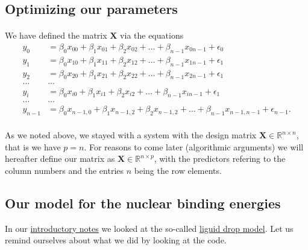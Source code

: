 \documentclass[%
oneside,                 %
final,                   %
10pt]{article}
\begin{document}
\subsection*{Optimizing our parameters}

\paragraph{}
We have defined the matrix $\bm{X}$ via the equations
\begin{align*}
y_0&=\beta_0x_{00}+\beta_1x_{01}+\beta_2x_{02}+\dots+\beta_{n-1}x_{0n-1}+\epsilon_0\\
y_1&=\beta_0x_{10}+\beta_1x_{11}+\beta_2x_{12}+\dots+\beta_{n-1}x_{1n-1}+\epsilon_1\\
y_2&=\beta_0x_{20}+\beta_1x_{21}+\beta_2x_{22}+\dots+\beta_{n-1}x_{2n-1}+\epsilon_1\\
\dots & \dots \\
y_{i}&=\beta_0x_{i0}+\beta_1x_{i1}+\beta_2x_{i2}+\dots+\beta_{n-1}x_{in-1}+\epsilon_1\\
\dots & \dots \\
y_{n-1}&=\beta_0x_{n-1,0}+\beta_1x_{n-1,2}+\beta_2x_{n-1,2}+\dots+\beta_{n-1}x_{n-1,n-1}+\epsilon_{n-1}.\\
\end{align*}

As we noted above, we stayed with a system with the design matrix 
 $\bm{X}\in {\mathbb{R}}^{n\times n}$, that is we have $p=n$. For reasons to come later (algorithmic arguments) we will hereafter define 
our matrix as $\bm{X}\in {\mathbb{R}}^{n\times p}$, with the predictors refering to the column numbers and the entries $n$ being the row elements.




\subsection*{Our model for the nuclear binding energies}

In our \href{{https://compphysics.github.io/MachineLearningMSU/doc/pub/Introduction/html/Introduction.html}}{introductory notes} we looked at the so-called \href{{https://en.wikipedia.org/wiki/Semi-empirical_mass_formula}}{liguid drop model}. Let us remind ourselves about what we did by looking at the code.
\end{document}
